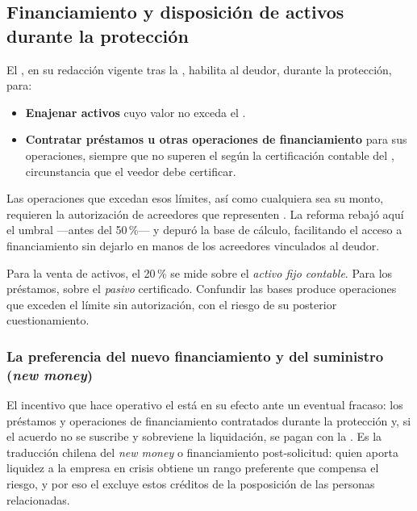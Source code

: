 \subsection{Financiamiento y disposición de activos durante la protección}

El , en su redacción vigente tras la \Lreforma{} \citeyearpar{ley-21563}, habilita al
deudor, durante la protección, para:

\begin{itemize}
  \item \textbf{Enajenar activos} cuyo valor no exceda el .
  \item \textbf{Contratar préstamos u otras operaciones de financiamiento} para sus operaciones,
  siempre que no superen el  según la certificación contable del
  , circunstancia que el veedor debe certificar.
\end{itemize}

Las operaciones que excedan esos límites, así como  cualquiera sea su monto, requieren la autorización de acreedores que representen
. La
reforma rebajó aquí el umbral ---antes del 50\,\%--- y depuró la base de cálculo, facilitando el
acceso a financiamiento sin dejarlo en manos de los acreedores vinculados al deudor.

\begin{alerta}
Para la venta de activos, el 20\,\% se mide sobre el \emph{activo fijo contable}. Para los
préstamos, sobre el \emph{pasivo} certificado. Confundir las bases produce operaciones que
exceden el límite sin autorización, con el riesgo de su posterior cuestionamiento.
\end{alerta}

\subsubsection{La preferencia del nuevo financiamiento y del suministro (\emph{new money})}

El incentivo que hace operativo el  está en su efecto ante un eventual fracaso: los
préstamos y operaciones de financiamiento contratados durante la protección  y, si el acuerdo no se suscribe y sobreviene la liquidación,
se pagan con la . Es la traducción
chilena del \emph{new money} o financiamiento post-solicitud: quien aporta liquidez a la empresa en
crisis obtiene un rango preferente que compensa el riesgo, y por eso el  excluye estos
créditos de la posposición de las personas relacionadas.

